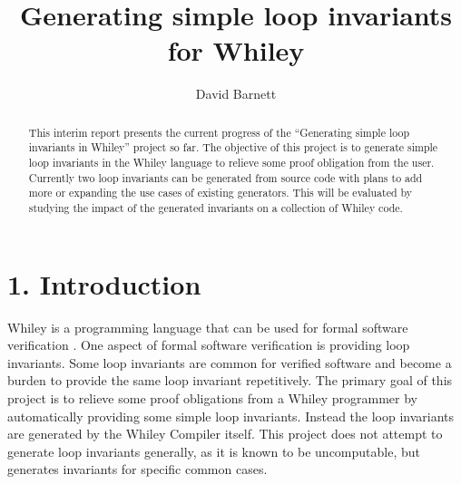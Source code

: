\documentclass[11pt, a4paper, twoside, openright]{report}
\title{Generating simple loop invariants for Whiley}
\author{David Barnett}
\date{}
\begin{document}
\frontmatter


\begin{abstract}
    This interim report presents the current progress of the ``Generating simple loop
    invariants in Whiley'' project so far.
    The objective of this project is to generate simple loop invariants in
    the Whiley language to relieve some proof obligation from the user.
    Currently two loop invariants can be generated from source code with plans
    to add more or expanding the use cases of existing generators.
    This will be evaluated by studying the impact of the generated invariants
    on a collection of Whiley code.
\end{abstract}


\maketitle


\mainmatter{}

\section*{1. Introduction}

Whiley is a programming language that can be used for formal software
verification \cite{whiley-origin}.
One aspect of formal software verification is providing loop
invariants.
Some loop invariants are common for verified software and become a burden to
provide the same loop invariant repetitively.
The primary goal of this project is to relieve some proof obligations from a
Whiley programmer by automatically providing some simple loop invariants.
Instead the loop invariants are generated by the Whiley Compiler itself.
This project does not attempt to generate loop invariants generally, as it is
known to be uncomputable, but generates invariants for specific common cases.
\end{document}
